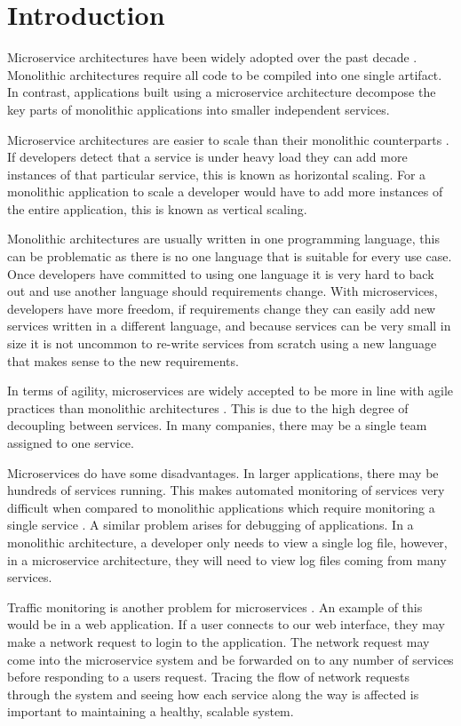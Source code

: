 \chapter{Introduction}

Microservice architectures have been widely adopted over the past decade \cite{7030212}. Monolithic architectures require all code to be compiled into one single artifact. In contrast, applications built using a microservice architecture decompose the key parts of monolithic applications into smaller independent services. 

Microservice architectures are easier to scale than their monolithic counterparts \cite{namiot2014micro}. If developers detect that a service is under heavy load they can add more instances of that particular service, this is known as horizontal scaling. For a monolithic application to scale a developer would have to add more instances of the entire application, this is known as vertical scaling. 

Monolithic architectures are usually written in one programming language, this can be problematic as there is no one language that is suitable for every use case. Once developers have committed to using one language it is very hard to back out and use another language should requirements change. With microservices, developers have more freedom, if requirements change they can easily add new services written in a different language, and because services can be very small in size it is not uncommon to re-write services from scratch using a new language that makes sense to the new requirements.

In terms of agility, microservices are widely accepted to be more in line with agile practices than monolithic architectures \cite{larrucea2018microservices}. This is due to the high degree of decoupling between services. In many companies, there may be a single team assigned to one service.

Microservices do have some disadvantages. In larger applications, there may be hundreds of services running. This makes automated monitoring of services very difficult when compared to monolithic applications which require monitoring a single service \cite{mayer2017dashboard}. A similar problem arises for debugging of applications. In a monolithic architecture, a developer only needs to view a single log file, however, in a microservice architecture, they will need to view log files coming from many services. 

Traffic monitoring is another problem for microservices \cite{sun2015security}. An example of this would be in a web application. If a user connects to our web interface, they may make a network request to login to the application. The network request may come into the microservice system and be forwarded on to any number of services before responding to a users request. Tracing the flow of network requests through the system and seeing how each service along the way is affected is important to maintaining a healthy, scalable system. 


